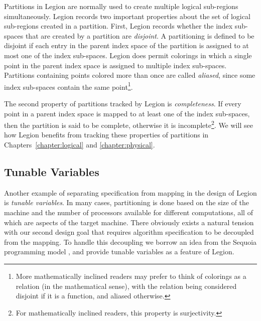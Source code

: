 Partitions in Legion are normally used to create multiple
logical sub-regions simultaneously.  Legion records two
important properties about the set of logical sub-regions
created in a partition. First, Legion records whether the
index sub-spaces that are created by a partition are 
{\em disjoint}. A partitioning is defined to be disjoint if
each entry in the parent index space of the partition is
assigned to at most one of the index sub-spaces. Legion does
permit colorings in which a single point in the parent
index space is assigned to multiple index sub-spaces. 
Partitions containing points colored more than once are
called {\em aliased}, since some index sub-spaces
contain the same point\footnote{
More mathematically inclined readers may prefer to think
of colorings as a relation (in the mathematical sense), with
the relation being considered disjoint if it is a function,
and aliased otherwise.}.

The second property of partitions tracked by Legion is
{\em completeness}. If every point in a parent index space
is mapped to at least one of the index sub-spaces, then
the partition is said to be complete, otherwise it is
incomplete\footnote{For mathematically inclined readers,
this property is surjectivity.}. We will see how Legion
benefits from tracking these properties of partitions
in Chapters~\ref{chapter:logical} and \ref{chapter:physical}.

\subsection{Tunable Variables}
\label{subsec:tunablevars}
Another example of separating specification from mapping
in the design of Legion is {\em tunable
variables}. In many cases, partitioning is done based 
on the size of the machine and the number of processors 
available for different computations, all of which are 
aspects of the target machine. There obviously exists a 
natural tension with our second design goal that requires
algorithm specification to be decoupled from the mapping.
To handle this decoupling we borrow an idea from the
Sequoia programming model \cite{Sequoia06}, and provide
tunable variables as a feature of Legion.

